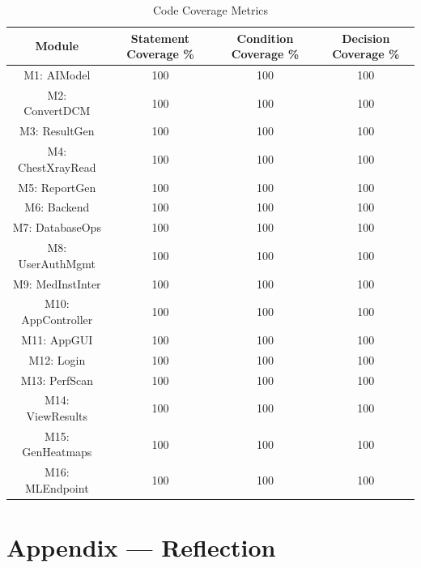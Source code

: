 \documentclass[12pt, titlepage]{article}
\begin{document}
\begin{table}[H]
    \centering
    \label{tab:CodeCovMetrics}
    \hspace*{-2cm}
    \begin{tabular}{|c|c|c|c|}
        \hline
        Module & Statement Coverage \% & Condition Coverage \% & Decision Coverage \% \\
        \hline
        M1: AIModel & 100 & 100 & 100 \\
        \hline
        M2: ConvertDCM & 100 & 100 & 100 \\
        \hline
        M3: ResultGen & 100 & 100 & 100 \\
        \hline
        M4: ChestXrayRead & 100 & 100 & 100 \\
        \hline
        M5: ReportGen & 100 & 100 & 100 \\
        \hline
        M6: Backend & 100 & 100 & 100 \\
        \hline
        M7: DatabaseOps & 100 & 100 & 100 \\
        \hline
        M8: UserAuthMgmt & 100 & 100 & 100 \\
        \hline
        M9: MedInstInter & 100 & 100 & 100 \\
        \hline
        M10: AppController & 100 & 100 & 100 \\
        \hline
        M11: AppGUI & 100 & 100 & 100 \\
        \hline
        M12: Login & 100 & 100 & 100 \\
        \hline
        M13: PerfScan & 100 & 100 & 100 \\
        \hline
        M14: ViewResults & 100 & 100 & 100 \\
        \hline
        M15: GenHeatmaps & 100 & 100 & 100 \\
        \hline
        M16: MLEndpoint & 100 & 100 & 100 \\
        \hline
    \end{tabular}
    \caption{Code Coverage Metrics}
\end{table}

% 
% 

\newpage{}
\section*{Appendix --- Reflection}

\end{document}
